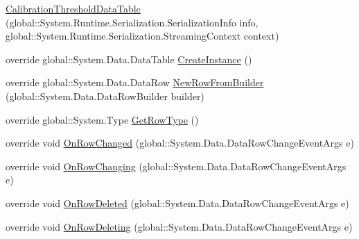 \begin{DoxyCompactItemize}
\hyperlink{class_env_int_1_1_win32_1_1_field_tech_1_1_manager_1_1_data_sets_1_1_guide_ware_mobile_data_set_e4a98fb4b531becb042ae997c9d8a15c_a51a25c8d58a1b95b08b945fc3c6a77e7}{Calibration\+Threshold\+Data\+Table} (global\+::\+System.\+Runtime.\+Serialization.\+Serialization\+Info info, global\+::\+System.\+Runtime.\+Serialization.\+Streaming\+Context context)
\item 
override global\+::\+System.\+Data.\+Data\+Table \hyperlink{class_env_int_1_1_win32_1_1_field_tech_1_1_manager_1_1_data_sets_1_1_guide_ware_mobile_data_set_e4a98fb4b531becb042ae997c9d8a15c_ad1a69ac93bebcec5da577e24144250fe}{Create\+Instance} ()
\item 
override global\+::\+System.\+Data.\+Data\+Row \hyperlink{class_env_int_1_1_win32_1_1_field_tech_1_1_manager_1_1_data_sets_1_1_guide_ware_mobile_data_set_e4a98fb4b531becb042ae997c9d8a15c_a2b0773a63c112af4f9f081057e34ff7b}{New\+Row\+From\+Builder} (global\+::\+System.\+Data.\+Data\+Row\+Builder builder)
\item 
override global\+::\+System.\+Type \hyperlink{class_env_int_1_1_win32_1_1_field_tech_1_1_manager_1_1_data_sets_1_1_guide_ware_mobile_data_set_e4a98fb4b531becb042ae997c9d8a15c_ac55220449c0650049bdcd259fda915f1}{Get\+Row\+Type} ()
\item 
override void \hyperlink{class_env_int_1_1_win32_1_1_field_tech_1_1_manager_1_1_data_sets_1_1_guide_ware_mobile_data_set_e4a98fb4b531becb042ae997c9d8a15c_ac7dffce7242d2a411d9b45d87798a3fd}{On\+Row\+Changed} (global\+::\+System.\+Data.\+Data\+Row\+Change\+Event\+Args e)
\item 
override void \hyperlink{class_env_int_1_1_win32_1_1_field_tech_1_1_manager_1_1_data_sets_1_1_guide_ware_mobile_data_set_e4a98fb4b531becb042ae997c9d8a15c_a618ee2560dec8d7ce0c0b6fd8fd9d32e}{On\+Row\+Changing} (global\+::\+System.\+Data.\+Data\+Row\+Change\+Event\+Args e)
\item 
override void \hyperlink{class_env_int_1_1_win32_1_1_field_tech_1_1_manager_1_1_data_sets_1_1_guide_ware_mobile_data_set_e4a98fb4b531becb042ae997c9d8a15c_a65a47d9c51ded5bb5defeb018fee13ca}{On\+Row\+Deleted} (global\+::\+System.\+Data.\+Data\+Row\+Change\+Event\+Args e)
\item 
override void \hyperlink{class_env_int_1_1_win32_1_1_field_tech_1_1_manager_1_1_data_sets_1_1_guide_ware_mobile_data_set_e4a98fb4b531becb042ae997c9d8a15c_a88018397e967fc9a220293bbd434fafb}{On\+Row\+Deleting} (global\+::\+System.\+Data.\+Data\+Row\+Change\+Event\+Args e)
\end{DoxyCompactItemize}
